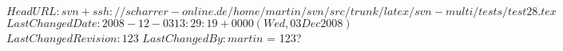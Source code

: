 \svnidlong
{$HeadURL: svn+ssh://scharrer-online.de/home/martin/svn/src/trunk/latex/svn-multi/tests/test28.tex $}
{$LastChangedDate: 2008-12-03 13:29:19 +0000 (Wed, 03 Dec 2008) $}
{$LastChangedRevision: 123 $}
{$LastChangedBy: martin $}
%
\svnrev{} = 123?

